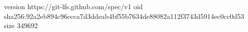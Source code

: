 version https://git-lfs.github.com/spec/v1
oid sha256:92a2eb894c96ccca7d3ddeab4bf55b7634de88082a112f3743d5914ec0cc0d53
size 349692
